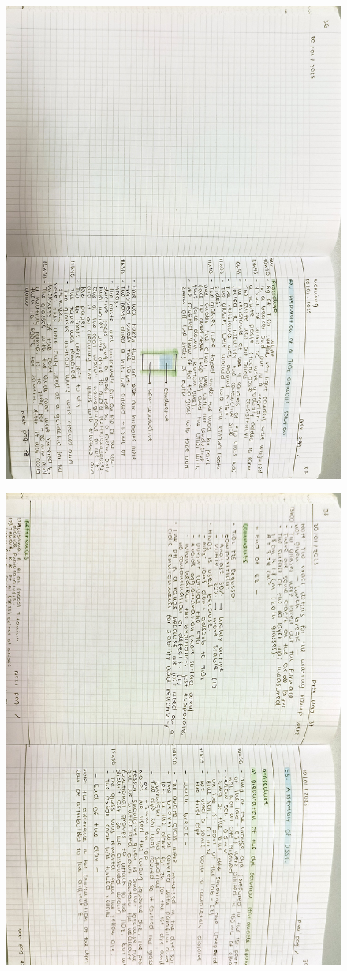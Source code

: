 \begin{figure}[H]
	\centering
	\includegraphics[width=0.6\linewidth, angle=90]{../images/compressed/IMG20250123173058.jpg}
\end{figure}
\begin{figure}[H]
	\centering
	\includegraphics[width=0.6\linewidth, angle=90]{../images/compressed/IMG20250123173103.jpg}
\end{figure}
